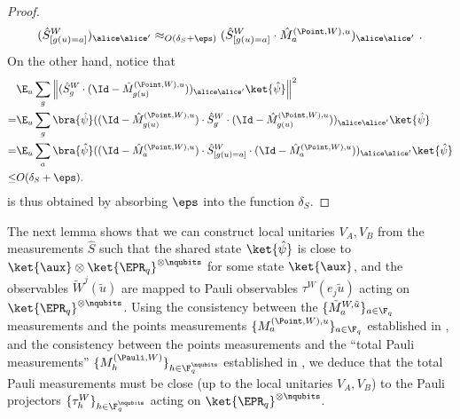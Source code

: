 \begin{proof}
\[
	(\hat{S}^W_{[g(u)=a]})_{\alice \alice'} \approx_{O(\delta_S + \eps)} (\hat{S}^W_{[g(u)=a]} \cdot \hat{M}^{(\Point, W), u}_{a})_{\alice \alice'}~.
\]
On the other hand, notice that
\begin{align*}
	&\E_u \sum_g \left \| (\hat{S}^W_{g} \cdot (\Id - \hat{M}^{(\Point, W), u}_{g(u)}))_{\alice \alice'} \ket{\hat{\psi}} \right \|^2 \\
	=& \E_u \sum_g \bra{\hat{\psi}} ((\Id - \hat{M}^{(\Point, W), u}_{g(u)}) \cdot \hat{S}^W_{g} \cdot (\Id - \hat{M}^{(\Point, W), u}_{g(u)}))_{\alice \alice'} \ket{\hat{\psi}} \\
	=& \E_u \sum_a \bra{\hat{\psi}} ((\Id - \hat{M}^{(\Point, W), u}_{a}) \cdot \hat{S}^W_{[g(u)=a]} \cdot (\Id - \hat{M}^{(\Point, W), u}_{a}))_{\alice \alice'} \ket{\hat{\psi}} \\
	\leq& O(\delta_S + \eps).
\end{align*}
 is thus obtained by absorbing $\eps$ into the function $\delta_S$.  
\end{proof}
	

 The next lemma shows that we can construct local unitaries $V_A,V_B$ from the measurements $\hat{S}$  such that the shared state $\ket{\hat{\psi}}$ is close to $\ket{\aux} \otimes \ket{\EPR_q}^{\otimes \nqubits}$ for some state $\ket{\aux}$, and the observables $\tilde{W}^j(\tilde{u})$ are mapped to Pauli observables $\tau^W(e_j \tilde{u})$ acting on $\ket{\EPR_q}^{\otimes \nqubits}$. Using the consistency between the $\{\tilde{M}^{W,\tilde{u}}_a\}_{a \in \F_q}$ measurements and the points measurements $\{M^{(\Point,W),u}_a\}_{a \in \F_q}$ established in , and the consistency between the points measurements and the ``total Pauli measurements'' $\{M^{(\Pauli,W)}_h\}_{h \in \F_q^\nqubits}$ established in , we deduce that the total Pauli measurements must be close (up to the local unitaries $V_A,V_B$) to the Pauli projectors $\{\tau^W_h\}_{h \in \F_q^\nqubits}$ acting on $\ket{\EPR_q}^{\otimes \nqubits}$.


